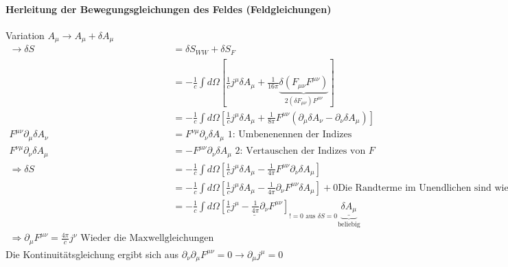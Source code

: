\documentclass[a4paper]{article}
\begin{document}
\paragraph{Herleitung der Bewegungsgleichungen des Feldes (Feldgleichungen)}
Variation $A_\mu \rightarrow A_\mu+\delta A_\mu$
\begin{align}
\rightarrow \delta S&=\delta S_{WW}+\delta S_F\\
&=-\frac{1}{c}\int d\Omega \left[ \frac{1}{c} j^\mu \delta\!A_\mu +
\frac{1}{16\pi} \underbrace{\delta(F_{\mu\nu}F^{\mu\nu})}_{2(\delta F_{\mu\nu})
F^{\mu\nu}} \right]\\
&=-\frac{1}{c}\int d\Omega \left[ \frac{1}{c} j^\mu \delta\!A_\mu +
\frac{1}{8\pi} F^{\mu\nu}\left( \partial_\mu\delta\!A_\nu-
\partial_\nu\delta\!A_\mu \right)\right]\\
F^{\mu\nu} \partial_\mu\delta\!A_\nu&=F^{\nu\mu} \partial_\nu\delta\!A_\mu
\text{ 1: Umbenenennen der Indizes}\\
F^{\nu\mu} \partial_\nu\delta\!A_\mu&=-F^{\mu\nu} \partial_\nu\delta\!A_\mu
\text{ 2: Vertauschen der Indizes von }F\\
\Rightarrow \delta S &= -\frac{1}{c}\int d\Omega \left[ \frac{1}{c} j^\mu
\delta\!A_\mu - \frac{1}{4\pi} F^{\mu\nu} \partial_\nu\delta\!A_\mu \right]\\
&= -\frac{1}{c}\int d\Omega \left[ \frac{1}{c} j^\mu
\delta\!A_\mu - \frac{1}{4\pi} \partial_\nu F^{\mu\nu} \delta\!A_\mu \right] +0
\text{Die Randterme im Unendlichen sind wieder 0} \\
&= -\frac{1}{c}\int d\Omega \underline{\left[ \frac{1}{c} j^\mu - \frac{1}{4\pi}
\partial_\nu F^{\mu\nu}\right]}_{!=0 \text{ aus } \delta\!S=0}
\underbrace{\underline{\delta\!A_\mu}}_{\text{beliebig}}\\
\Rightarrow \partial_\mu F^{\mu\nu}=\frac{4\pi}{c}j^\nu \text{ Wieder die
Maxwellgleichungen}
\end{align}
Die Kontinuitätsgleichung ergibt sich aus $\partial_\nu\partial_\mu
F^{\mu\nu}=0 \rightarrow \partial_\mu j^\mu=0$
\end{document}
